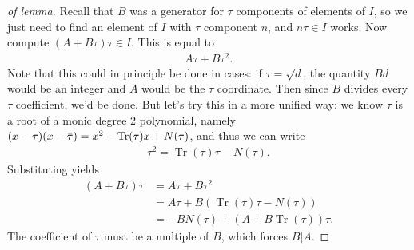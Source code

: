 \begin{proof}[of lemma]

Recall that \(B\) was a generator for \(\tau\) components of elements of
\(I\), so we just need to find an element of \(I\) with \(\tau\)
component \(n\), and \(n \tau \in I\) works. Now compute
\((A + B \tau) \tau\in I\). This is equal to
\begin{align*}
A \tau + B \tau^2
.\end{align*}
Note that this could in principle be done in cases: if
\(\tau = \sqrt{d}\), the quantity \(Bd\) would be an integer and \(A\)
would be the \(\tau\) coordinate. Then since \(B\) divides every
\(\tau\) coefficient, we'd be done. But let's try this in a more unified
way: we know \(\tau\) is a root of a monic degree 2 polynomial, namely
\((x - \tau) (x - \mkern 1.5mu\overline{\mkern-1.5mu\tau\mkern-1.5mu}\mkern 1.5mu) = x^2 - \operatorname{Tr}( \tau)x + N( \tau)\),
and thus we can write
\begin{align*}
\tau^2 = \operatorname{Tr}( \tau) \tau - N( \tau)
.\end{align*}
Substituting yields
\begin{align*}
(A + B \tau) \tau
&= A \tau + B \tau^2 \\
&= A \tau + B ( \operatorname{Tr}( \tau) \tau - N( \tau) ) \\
&= - B N( \tau) + (A + B \operatorname{Tr}( \tau ) ) \tau
.\end{align*}
The coefficient of \(\tau\) must be a multiple of \(B\), which forces
\(B\mathrel{\Big|}A\).

\end{proof}


